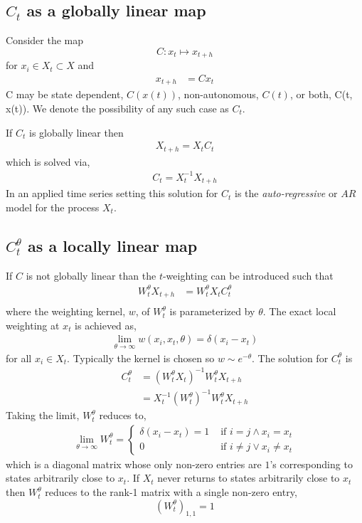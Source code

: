 \documentclass{article}
\begin{document}
\subsection{$C_t$ as a globally linear map}
Consider the map 
$$
    C: x_t \mapsto x_{t+h}
$$
for $x_i \in X_t \subset X$ and
\begin{align*}
    x_{t+h} & = C x_t
\end{align*}
C may be state dependent, $C(x(t))$, non-autonomous, $C(t)$, or both, C(t, x(t)). We denote the possibility of any such case as $C_t$.

If $C_t$ is globally linear then
\begin{align*}
    X_{t+h} = X_t C_t
\end{align*}
which is solved via,
\begin{align*}
    C_t = X_{t}^{-1} X_{t+h}
\end{align*}
In an applied time series setting this solution for $C_t$ is the \textit{auto-regressive} or $AR$ model for the process $X_t$.

\subsection{$C_t^\theta$ as a locally linear map}
If $C$ is not globally linear than the $t$-weighting can be introduced such that
\begin{align*}
    W_t^\theta X_{t+h} & = W_t^\theta X_t C_t^\theta \\
\end{align*}
where the weighting kernel, $w$, of  $W_t^\theta$ is parameterized by $\theta$. The exact local weighting at $x_t$ is achieved as,
\begin{align*}
    \lim_{\theta\rightarrow\infty} w(x_i, x_t, \theta) = \delta(x_i - x_t)
\end{align*}
for all $x_i \in X_t$. Typically the kernel is chosen so $w \sim e^{-\theta}$. The solution for $C_t^\theta$ is
\begin{align*}
    C_t^\theta &= {(W_t^\theta X_t)}^{-1} W_t^\theta X_{t+h} \\
    &= X_t^{-1} (W_t^\theta)^{-1} W_t^\theta X_{t+h}
\end{align*}
Taking the limit, $W_t^\theta$ reduces to,
\begin{align*}
    \lim_{\theta\rightarrow\infty} W_t^\theta = 
    \begin{cases} 
      \delta(x_i - x_t) = 1 &\text{ if }i=j \wedge x_i = x_t\\
      0 &\text{ if } i\neq j \vee x_i \neq x_t
   \end{cases}
\end{align*}
which is a diagonal matrix whose only non-zero entries are $1$'s corresponding to states arbitrarily close to $x_t$. If $X_t$ never returns to states arbitrarily close to $x_t$ then $W_t^\theta$ reduces to the rank-1 matrix with a single non-zero entry, 
$$
    (W_t^\theta)_{1,1} = 1
$$
\end{document}
